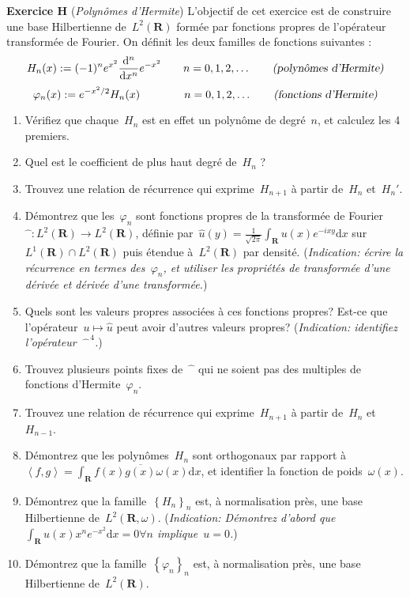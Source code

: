 \documentclass[a4paper,11pt]{article}    %
\def\R{\mathbf{R}}                  %
\def\d{\mathrm{d}}                  %
\newcommand{\solution}[1]{}
\begin{document}
{\bf Exercice H} ({\sl Polynômes d'Hermite})
L'objectif de cet exercice est de construire une base Hilbertienne de~$L^2(\R)$
formée par fonctions propres de l'opérateur transformée de Fourier.
On définit les deux familles de fonctions suivantes :
\[
	H_n(x):=(-1)^ne^{x^2}\frac{\d^n}{\d x^n}e^{-x^2}\qquad n=0,1,2,\ldots
	\qquad\textsl{(polynômes d'Hermite)}
\]
\[
	\varphi_n(x):=e^{-x^2/2}H_n(x)\qquad\qquad n=0,1,2,\ldots
	\qquad\textsl{(fonctions d'Hermite)}
\]
\begin{enumerate}
	\item
		Vérifiez que chaque~$H_n$ est en effet un polynôme de
		degré~$n$, et calculez les 4 premiers.
		\solution{\\
			Il faut vérifier que les dérivées successives de la fonction~$x\mapsto e^{-x^2}$
			sont de la forme~$P_n(x) e^{-x^2}$ avec~$P_n$ un polynôme de degré~$n$.
			Ceci est trivialement vrai pour la dérivée~$0$-ème.
			Ensuite on a~$\left(P_n(x)
			e^{-x^2}\right)'=P_n'(x)e^{-x^2}-2xP_n(x)e^{-x^2}$
		}
	\item Quel est le coefficient de plus haut degré de~$H_n$ ?
	\item Trouvez une relation de récurrence qui
		exprime~$H_{n+1}$ à partir de~$H_n$ et~$H_n'$.
	\item Démontrez que les~$\varphi_n$ sont fonctions propres de la transformée
		de Fourier~${}\widehat{\phantom{u}}:L^2(\R)\to L^2(\R)$, définie
		par~$\widehat{u}(y)=\frac1{\sqrt{2\pi}}\int_\R u(x)e^{-ixy}\d x$
		sur~$L^1(\R)\cap L^2(\R)$
		puis étendue à~$L^2(\R)$ par densité.  ({\sl Indication: écrire la
		récurrence en termes des~$\varphi_n$, et utiliser les propriétés de
		transformée d'une dérivée et dérivée d'une transformée.})
	\item Quels sont les valeurs propres associées à ces fonctions propres?
		Est-ce que l'opérateur~$u\mapsto\widehat u$ peut avoir d'autres valeurs
		propres? ({\sl Indication: identifiez l'opérateur $\
		{}\widehat{\phantom{u}}^{\,4}$.})
	\item Trouvez plusieurs points fixes de~$\widehat{\phantom{u}}$ qui
	ne soient pas des multiples de fonctions d'Hermite~$\varphi_n$.
	\item Trouvez une relation de récurrence qui
		exprime~$H_{n+1}$ à partir de~$H_n$ et~$H_{n-1}$.
	\item Démontrez que les polynômes~$H_n$ sont orthogonaux par rapport
		à~$\left<f,g\right>=\int_\R f(x)\overline{g(x)}\omega(x)\d x$, et
		identifier la fonction de poids~$\omega(x)$.
	\item Démontrez que la famille~$\left\{H_n\right\}_n$ est, à normalisation
		près, une base
		Hilbertienne de~$L^2(\R,\omega)$.  ({\sl Indication: Démontrez d'abord
		que~$\int_\R u(x)x^ne^{-x^2}\d x=0\forall n$ implique~$u=0$.})
	\item Démontrez que la famille~$\left\{\varphi_n\right\}_n$ est, à
		normalisation près, une base Hilbertienne de~$L^2(\R)$.
\end{enumerate}
\end{document}
